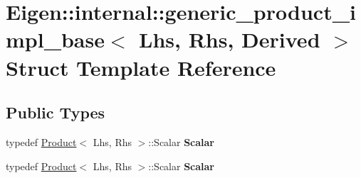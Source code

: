 \hypertarget{struct_eigen_1_1internal_1_1generic__product__impl__base}{}\section{Eigen\+:\+:internal\+:\+:generic\+\_\+product\+\_\+impl\+\_\+base$<$ Lhs, Rhs, Derived $>$ Struct Template Reference}
\label{struct_eigen_1_1internal_1_1generic__product__impl__base}
\subsection*{Public Types}
\begin{DoxyCompactItemize}
\item 
\mbox{\label{struct_eigen_1_1internal_1_1generic__product__impl__base_a5cc388e261b40abd169f954f94e4cc01}} 
typedef \hyperlink{group___core___module_class_eigen_1_1_product}{Product}$<$ Lhs, Rhs $>$\+::Scalar {\bfseries Scalar}
\item 
\mbox{\label{struct_eigen_1_1internal_1_1generic__product__impl__base_a5cc388e261b40abd169f954f94e4cc01}} 
typedef \hyperlink{group___core___module_class_eigen_1_1_product}{Product}$<$ Lhs, Rhs $>$\+::Scalar {\bfseries Scalar}
\end{DoxyCompactItemize}
